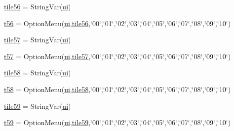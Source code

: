 \begin{DoxyCompactItemize}
\item 
\mbox{\hyperlink{namespacegui_ae2646c4dbcba62132b11bc430f3c5b45}{tile56}} = String\+Var(\mbox{\hyperlink{namespacegui_a40ab7281456eadbea2dc2038f5c24fa1}{ui}})
\item 
\mbox{\hyperlink{namespacegui_ad1e784325f13abbece17d08027ec7448}{t56}} = Option\+Menu(\mbox{\hyperlink{namespacegui_a40ab7281456eadbea2dc2038f5c24fa1}{ui}},\mbox{\hyperlink{namespacegui_ae2646c4dbcba62132b11bc430f3c5b45}{tile56}},\char`\"{}00\char`\"{},\char`\"{}01\char`\"{},\char`\"{}02\char`\"{},\char`\"{}03\char`\"{},\char`\"{}04\char`\"{},\char`\"{}05\char`\"{},\char`\"{}06\char`\"{},\char`\"{}07\char`\"{},\char`\"{}08\char`\"{},\char`\"{}09\char`\"{},\char`\"{}10\char`\"{})
\item 
\mbox{\hyperlink{namespacegui_aa3077c3a423a682ff87cf7a59a096a1a}{tile57}} = String\+Var(\mbox{\hyperlink{namespacegui_a40ab7281456eadbea2dc2038f5c24fa1}{ui}})
\item 
\mbox{\hyperlink{namespacegui_a656fba4855925e2514610bd13473ac1d}{t57}} = Option\+Menu(\mbox{\hyperlink{namespacegui_a40ab7281456eadbea2dc2038f5c24fa1}{ui}},\mbox{\hyperlink{namespacegui_aa3077c3a423a682ff87cf7a59a096a1a}{tile57}},\char`\"{}00\char`\"{},\char`\"{}01\char`\"{},\char`\"{}02\char`\"{},\char`\"{}03\char`\"{},\char`\"{}04\char`\"{},\char`\"{}05\char`\"{},\char`\"{}06\char`\"{},\char`\"{}07\char`\"{},\char`\"{}08\char`\"{},\char`\"{}09\char`\"{},\char`\"{}10\char`\"{})
\item 
\mbox{\hyperlink{namespacegui_a99c90d661722beb1c379e2d9fc6169a4}{tile58}} = String\+Var(\mbox{\hyperlink{namespacegui_a40ab7281456eadbea2dc2038f5c24fa1}{ui}})
\item 
\mbox{\hyperlink{namespacegui_a1b3b256d01a50dc355027775c504ea35}{t58}} = Option\+Menu(\mbox{\hyperlink{namespacegui_a40ab7281456eadbea2dc2038f5c24fa1}{ui}},\mbox{\hyperlink{namespacegui_a99c90d661722beb1c379e2d9fc6169a4}{tile58}},\char`\"{}00\char`\"{},\char`\"{}01\char`\"{},\char`\"{}02\char`\"{},\char`\"{}03\char`\"{},\char`\"{}04\char`\"{},\char`\"{}05\char`\"{},\char`\"{}06\char`\"{},\char`\"{}07\char`\"{},\char`\"{}08\char`\"{},\char`\"{}09\char`\"{},\char`\"{}10\char`\"{})
\item 
\mbox{\hyperlink{namespacegui_a841a445f892ff85a173e8562fe380797}{tile59}} = String\+Var(\mbox{\hyperlink{namespacegui_a40ab7281456eadbea2dc2038f5c24fa1}{ui}})
\item 
\mbox{\hyperlink{namespacegui_a380d67606f2286d1725df8cdc4caad7a}{t59}} = Option\+Menu(\mbox{\hyperlink{namespacegui_a40ab7281456eadbea2dc2038f5c24fa1}{ui}},\mbox{\hyperlink{namespacegui_a841a445f892ff85a173e8562fe380797}{tile59}},\char`\"{}00\char`\"{},\char`\"{}01\char`\"{},\char`\"{}02\char`\"{},\char`\"{}03\char`\"{},\char`\"{}04\char`\"{},\char`\"{}05\char`\"{},\char`\"{}06\char`\"{},\char`\"{}07\char`\"{},\char`\"{}08\char`\"{},\char`\"{}09\char`\"{},\char`\"{}10\char`\"{})

\end{DoxyCompactItemize}
